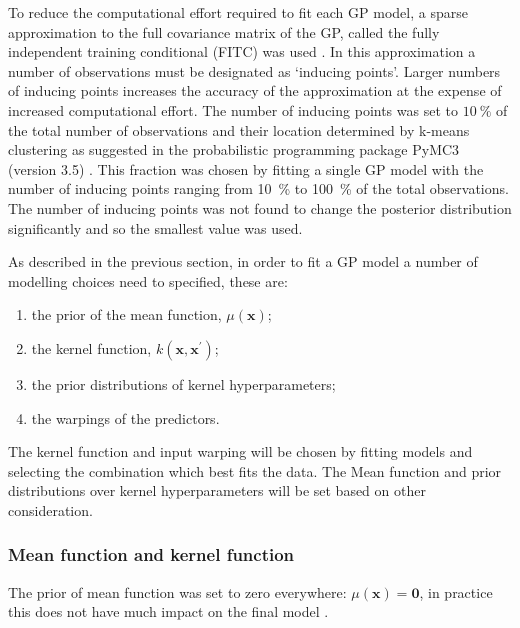 To reduce the computational effort required to fit each GP model, a sparse approximation to the full covariance matrix of the GP, called the fully independent training conditional (FITC) was used \cite{quinonero-candelaUnifyingViewSparse2005}. In this approximation a number of observations must be designated as `inducing points'. Larger numbers of inducing points increases the accuracy of the approximation at the expense of increased computational effort. The number of inducing points was set to $\SI{10}{\percent}$ of the total number of observations and their location determined by k-means clustering as suggested in the probabilistic programming package PyMC3 (version 3.5) \cite{salvatierProbabilisticProgrammingPython2016}. This fraction was chosen by fitting a single GP model with the number of inducing points ranging from \SI{10}{\percent} to \SI{100}{\percent} of the total observations. The number of inducing points was not found to change the posterior distribution significantly and so the smallest value was used. 

As described in the previous section, in order to fit a GP model a number of modelling choices need to specified, these are: 
\begin{enumerate}
    \item the prior of the mean function, $\mu(\mathbf{x})$;
    \item the kernel function, $k(\mathbf{x}, \mathbf{x}^{\prime})$;
    \item the prior distributions of kernel hyperparameters;
    \item the warpings of the predictors.
\end{enumerate}

The kernel function and input warping will be chosen by fitting models and selecting the combination which best fits the data. The Mean function and prior distributions over kernel hyperparameters will be set based on other consideration.

\subsubsection*{Mean function and kernel function}

The prior of mean function  was set to zero everywhere: $\mu(\mathbf{x})=\mathbf{0}$, in practice this does not have much impact on the final model \cite{brochuTutorialBayesianOptimization2010}. 

